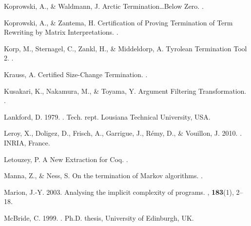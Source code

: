 \begin{thebibliography}{}
Koprowski, A., \& Waldmann, J.
\newblock Arctic Termination\ldots Below Zero.
.

Koprowski, A., \& Zantema, H.
\newblock Certification of Proving Termination of Term Rewriting by Matrix
  Interpretations.
.

Korp, M., Sternagel, C., Zankl, H., \& Middeldorp, A.
\newblock Tyrolean Termination Tool 2.
.

Krauss, A.
\newblock Certified Size-Change Termination.
.

Kusakari, K., Nakamura, M., \& Toyama, Y.
\newblock Argument Filtering Transformation.
.

Lankford, D. 1979.
.
\newblock Tech. rept. Lousiana Technical University, USA.

Leroy, X., Doligez, D., Frisch, A., Garrigue, J., R{\'e}my, D., \& Vouillon, J.
  2010.
.
\newblock INRIA, France.


Letouzey, P.
\newblock A New Extraction for {Coq}.
.

Manna, Z., \& Ness, S.
\newblock On the termination of {Markov} algorithms.
.

Marion, J.-Y. 2003.
\newblock Analysing the implicit complexity of programs.
, {\bf 183}(1), 2--18.

McBride, C. 1999.
.
\newblock Ph.D. thesis, University of Edinburgh, UK.


\end{thebibliography}
